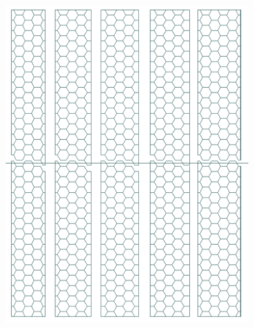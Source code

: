 \begin{figure}
\begin{subfigure}[b]{.49\textwidth}
		\caption{}
		\label{fig:Calorimeter:SiDECAL:hexagon}
	\end{subfigure}\hfill
	\begin{subfigure}[b]{.49\textwidth}
		\includegraphics[width=\linewidth]{Calorimeter/SiliconTungstenSiD/siliconLayout}
		\caption{}
		\label{fig:Calorimeter:SiDECAL:siliconLayout}
	\end{subfigure}
\end{figure}

